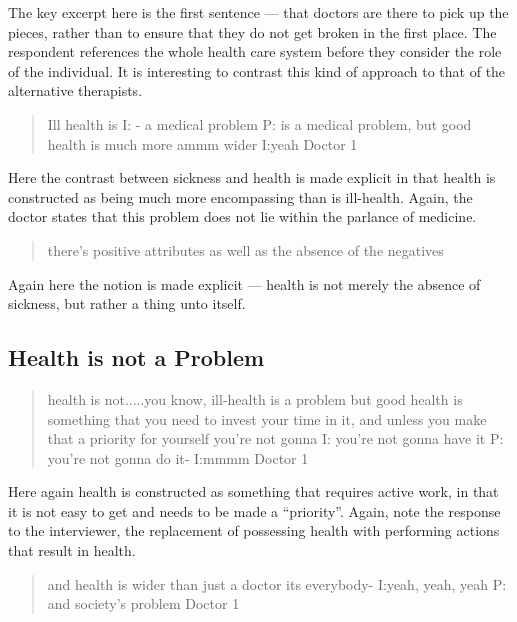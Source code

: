 The key excerpt here is the first sentence --- that doctors are there to pick up the pieces, rather than to ensure that they do not get broken in  the first place. The respondent references the whole health care system before they consider the role of the individual. It is interesting to contrast this kind of approach to that of the alternative therapists. 

\begin{quotation}
  
Ill health is 
I: - a medical problem 
P: is a medical problem, but good health is much more ammm wider
I:yeah 
Doctor 1
\end{quotation}

Here the contrast between sickness and health is made explicit in that health is constructed as being much more encompassing than is ill-health. Again, the doctor states that this problem does not lie within the parlance of medicine. 

\begin{quotation}
  there's positive attributes as well as the absence of the negatives

\end{quotation}
Again here the notion is made explicit --- health is not merely the absence of sickness, but rather a thing unto itself. 

\subsection{Health is not a Problem}
\label{sec:health-not-problem}

\begin{quotation}
  health is not.....you know, ill-health is a problem but good health is something that you need to invest your time in it, and unless you make that a priority for yourself you're not gonna
I: you're not gonna have it
P: you're not gonna do it-
I:mmmm
Doctor 1
\end{quotation}


Here again health is constructed as something that requires active work, in that it is not easy to get and needs to be made a ``priority''. Again, note the response to the interviewer, the replacement of possessing health with performing actions that result in health. 


\begin{quotation}
    and health is wider than just a doctor its everybody-
I:yeah, yeah, yeah
P: and society's problem 
Doctor 1
\end{quotation}

